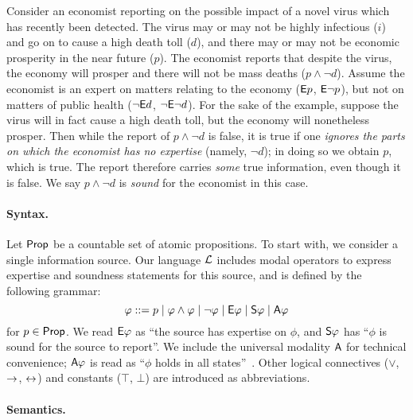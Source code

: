\begin{example}
    \label{exp_ex_economist_motivation}

    Consider an economist reporting on the possible impact of a novel virus
    which has recently been detected. The virus may or may not be highly
    infectious ($i$) and go on to cause a high death toll ($d$), and there may
    or may not be economic prosperity in the near future ($p$). The economist
    reports that despite the virus, the economy will prosper and there will not
    be mass deaths ($p \land \neg d$). Assume the economist is an expert on
    matters relating to the economy ($\E p$, $\E\neg p$), but not on matters of
    public health ($\neg\E d$, $\neg\E\neg d$). For the sake of the example,
    suppose the virus will in fact cause a high death toll, but the economy
    will nonetheless prosper. Then while the report of $p \land \neg d$ is
    false, it is true if one \emph{ignores the parts on which the economist has
    no expertise} (namely, $\neg d$); in doing so we obtain $p$, which is true.
    The report therefore carries \emph{some} true information, even though it
    is false. We say $p \land \neg d$ is \emph{sound} for the economist in this
    case.

\end{example}

\paragraph{Syntax.}

Let $\Prop$ be a countable set of atomic propositions.
%
To start with, we consider a single information source. Our language $\cL$
includes modal operators to express expertise and soundness statements for this
source, and is defined by the following grammar:
\[
\phi ::=
 p \mid
 \phi \land \phi \mid
 \neg\phi \mid
 \E\phi \mid
 \S\phi \mid
 \A\phi
\]
for $p \in \Prop$. We read $\E\phi$ as ``the source has expertise on
$\phi$, and $\S\phi$ has ``$\phi$ is sound for the source to
report''. We include the universal modality $\A$
for technical convenience; $\A\phi$ is read as ``$\phi$ holds in all
states''~\cite{goranko_1992}.  Other logical connectives ($\lor$, $\limplies$,
$\liff$) and constants ($\top$, $\bot$) are introduced as
abbreviations.

\paragraph{Semantics.}

